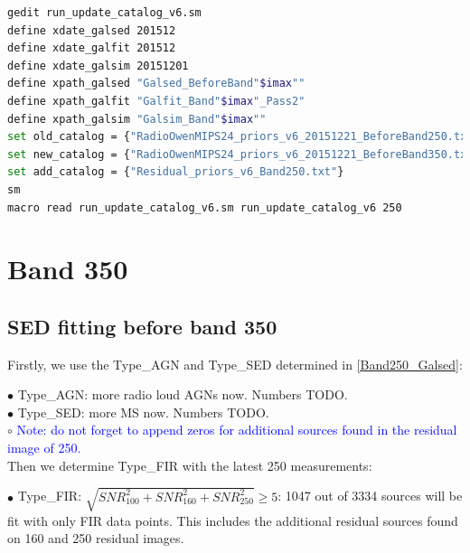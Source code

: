 \documentclass[11pt,a4paper]{article}
\begin{document}
\begin{lstlisting}[language=bash]
gedit run_update_catalog_v6.sm
define xdate_galsed 201512
define xdate_galfit 201512
define xdate_galsim 20151201
define xpath_galsed "Galsed_BeforeBand"$imax""
define xpath_galfit "Galfit_Band"$imax"_Pass2"
define xpath_galsim "Galsim_Band"$imax""
set old_catalog = {"RadioOwenMIPS24_priors_v6_20151221_BeforeBand250.txt"}
set new_catalog = {"RadioOwenMIPS24_priors_v6_20151221_BeforeBand350.txt"}
set add_catalog = {"Residual_priors_v6_Band250.txt"}
sm
macro read run_update_catalog_v6.sm run_update_catalog_v6 250
\end{lstlisting}


\clearpage

\section{Band 350}

\subsection{SED fitting before band 350}
\label{Band350_Galsed}

Firstly, we use the Type\_AGN and Type\_SED determined in \ref{Band250_Galsed}:

\indent\hspace{15pt}$\bullet$ 
Type\_AGN: more radio loud AGNs now. Numbers TODO. 
\\
\indent\hspace{15pt}$\bullet$ 
Type\_SED: more MS now. Numbers TODO. 
\\
\indent\hspace{15pt}$\circ$ 
\textcolor{blue}{Note: \textcolor{blue}{do not forget} to append zeros for additional sources found in the residual image of 250.}
\\

Then we determine Type\_FIR with the latest 250 measurements:

\indent\hspace{15pt}$\bullet$ 
Type\_FIR: $\sqrt{SNR_{100}^2+SNR_{160}^2+SNR_{250}^2} \ge 5$: 1047 out of 3334 sources will be fit with only FIR data points. This includes the additional residual sources found on 160 and 250 residual images. 
\\
\end{document}
